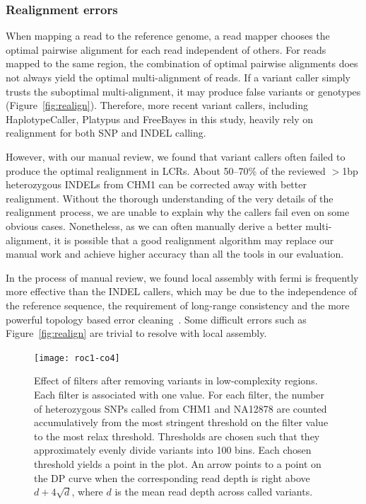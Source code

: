 \documentclass{bioinfo}
\begin{document}
\subsubsection{Realignment errors}
When mapping a read to the reference genome, a read mapper chooses the optimal
pairwise alignment for each read independent of others. For reads mapped to the
same region, the combination of optimal pairwise alignments does not always
yield the optimal multi-alignment of reads. If a variant caller simply trusts
the suboptimal multi-alignment, it may produce false variants or genotypes
(Figure~\ref{fig:realign}). Therefore, more recent variant callers, including
HaplotypeCaller, Platypus and FreeBayes in this study, heavily rely on
realignment for both SNP and INDEL calling.

However, with our manual review, we found that variant callers often failed to
produce the optimal realignment in LCRs. About 50--70\% of the reviewed
$>$1bp heterozygous INDELs from CHM1 can be corrected away with better
realignment. Without the thorough understanding of the very details of the
realignment process, we are unable to explain why the callers fail even on some
obvious cases. Nonetheless, as we can often manually derive a better
multi-alignment, it is possible that a good realignment algorithm may replace
our manual work and achieve higher accuracy than all the tools in our
evaluation.

In the process of manual review, we found local assembly with fermi is
frequently more effective than the INDEL callers, which may be due to the
independence of the reference sequence, the requirement of long-range
consistency and the more powerful topology based error
cleaning~\citep{Zerbino:2008uq}. Some difficult errors such as
Figure~\ref{fig:realign} are trivial to resolve with local assembly.

\begin{figure}
\texttt{[image: roc1-co4]}
\caption{Effect of filters after removing variants in low-complexity regions.
Each filter is associated with one value.  For each filter, the number of
heterozygous SNPs called from CHM1 and NA12878 are counted accumulatively from
the most stringent threshold on the filter value to the most relax threshold.
Thresholds are chosen such that they approximately evenly divide variants into
100 bins. Each chosen threshold yields a point in the plot. An arrow points
to a point on the DP curve when the corresponding read depth is right above
$d+4\sqrt{d}$, where $d$ is the mean read depth across called variants.}\label{fig:roc} \end{figure}
\end{document}
